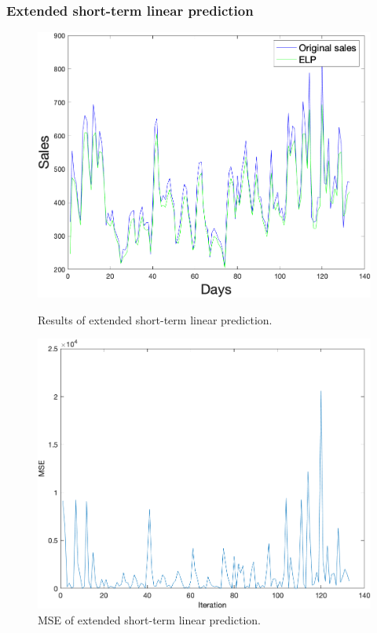         \subsubsection{Extended short-term linear prediction} \label{subsec:res_estlp}
        \begin{figure}[h]
            \centering
            \begin{minipage}{0.45\textwidth}
                \centering
                \includegraphics[width=1\textwidth]{figures/expELP.png}
                \caption{Results of extended short-term linear prediction.}
                \label{fig:eslpres}
            \end{minipage}\hfill
            \begin{minipage}{0.45\textwidth}
                \centering
                \includegraphics[width=1\textwidth]{figures/expMseELP.png}
                \caption{MSE of extended short-term linear prediction.}
                \label{fig:eslpmse}
            \end{minipage}
        \end{figure}
        \newpage

